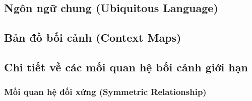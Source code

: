 \documentclass{report} %
\begin{document}
% 


% 



% 



% 


% 


% 

\subsection{Ngôn ngữ chung (Ubiquitous Language)}

% 

\subsection{Bản đồ bối cảnh (Context Maps)}



% 

\subsection{Chi tiết về các mối quan hệ bối cảnh giới hạn}

% 

\subsubsection{Mối quan hệ đối xứng (Symmetric Relationship)}

\end{document}
